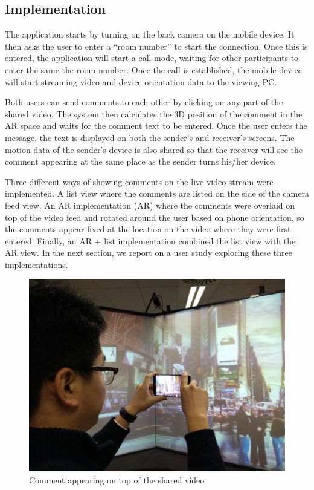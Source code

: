 \subsection{Implementation}

The application starts by turning on the back camera on the mobile device. It then asks the user to enter a “room number” to start the connection. Once this is entered, the application will start a call mode, waiting for other participants to enter the same the room number. Once the call is established, the mobile device will start streaming video and device orientation data to the viewing PC. 

Both users can send comments to each other by clicking on any part of the shared video. The system then calculates the 3D position of the comment in the AR space and waits for the comment text to be entered. Once the user enters the message, the text is displayed on both the sender's and receiver's screens. The motion data of the sender's device is also shared so that the receiver will see the comment appearing at the same place as the sender turns his/her device. 

Three different ways of showing comments on the live video stream were implemented. A list view where the comments are listed on the side of the camera feed view. An AR implementation (AR) where the comments were overlaid on top of the video feed and rotated around the user based on phone orientation, so the comments appear fixed at the location on the video where they were first entered. Finally, an AR + list implementation combined the list view with the AR view. In the next section, we report on a user study exploring these three implementations.

\begin{figure}[ht]
  \centering
  \includegraphics[width=.8\linewidth]{images/mgia16/participant2}
  \caption{Comment appearing on top of the shared video}
	\label{comments}
\end{figure}


